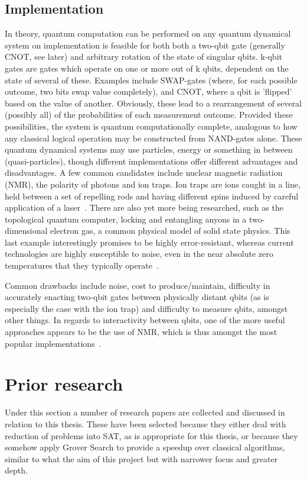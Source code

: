 \documentclass[msc,lith,english]{liuthesis}
\begin{document}
\subsection{Implementation}
In theory, quantum computation can be performed on any quantum dynamical system on implementation is feasible for both both a two-qbit gate (generally CNOT, see later) and arbitrary rotation of the state of singular qbits. k-qbit gates are gates which operate on one or more out of k qbits, dependent on the state of several of these. Examples include SWAP-gates (where, for each possible outcome, two bits swap value completely), and CNOT, where a qbit is 'flipped' based on the value of another. Obviously, these lead to a rearrangement of several (possibly all) of the probabilities of each measurement outcome\cite{QCQI}. Provided these possibilities, the system is quantum computationally complete, analogous to how any classical logical operation may be constructed from NAND-gates alone. These quantum dynamical systems may use particles, energy or something in between (quasi-particles), though different implementations offer different advantages and disadvantages. A few common candidates include nuclear magnetic radiation (NMR), the polarity of photons and ion traps. Ion traps are ions caught in a line, held between a set of repelling rods and having different spins induced by careful application of a laser~\cite{QCQI, EIQC}. There are also yet more being researched, such as the topological quantum computer, locking and entangling anyons in a two-dimensional electron gas, a common physical model of solid state physics. This last example interestingly promises to be highly error-resistant, whereas current technologies are highly susceptible to noise, even in the near absolute zero temperatures that they typically operate~\cite{EIQC}. 

Common drawbacks include noise, cost to produce/maintain, difficulty in accurately enacting two-qbit gates between physically distant qbits (as is especially the case with the ion trap) and difficulty to measure qbits, amongst other things. In regards to interactivity between qbits, one of the more useful approaches appears to be the use of NMR, which is thus amongst the most popular implementations~\cite{QCQI}.

\section{Prior research}
Under this section a number of research papers are collected and discussed in relation to this thesis. These have been selected because they either deal with reduction of problems into SAT, as is appropriate for this thesis, or because they somehow apply Grover Search to provide a speedup over classical algorithms, similar to what the aim of this project but with narrower focus and greater depth.
\end{document}
